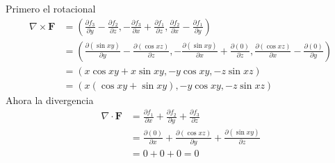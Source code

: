 \documentclass{article}
\begin{document}
\begin{enumerate}
{\begin{enumerate}
{			\color{azul}
            Primero el rotacional
            \begin{align*}
                \nabla \times \mathbf{F}
                &= (
                \frac{\partial f_3}{\partial y}
                - \frac{\partial f_2}{\partial z},
                -\frac{\partial f_3}{\partial x}
                +\frac{\partial f_1}{\partial z},
                \frac{\partial f_2}{\partial x}
                -\frac{\partial f_1}{\partial y}
                )\\
                &= (
                \frac{\partial (\sin xy)}{\partial y}
                - \frac{\partial (\cos xz)}{\partial z},
                -\frac{\partial (\sin xy)}{\partial x}
                +\frac{\partial (0)}{\partial z},
                \frac{\partial (\cos xz)}{\partial x}
                -\frac{\partial (0)}{\partial y}
                )\\
                &= (
                x\cos xy + x \sin xy, -y\cos xy, -z\sin xz
                )\\
                &= (
                x (\cos xy + \sin xy), -y\cos xy, -z\sin xz
                )
            \end{align*}
            Ahora la divergencia
            \begin{align*}
                \nabla \cdot \mathbf{F} &= \frac{\partial f_1}{\partial x}
                +\frac{\partial f_2}{\partial y}
                +\frac{\partial f_3}{\partial z} \\
                &= \frac{\partial (0)}{\partial x}
                +\frac{\partial (\cos xz)}{\partial y}
                +\frac{\partial (\sin xy)}{\partial z}\\
                &= 0 + 0 + 0 = 0
            \end{align*}
            }


\end{enumerate}}
\end{enumerate}
\end{document}
